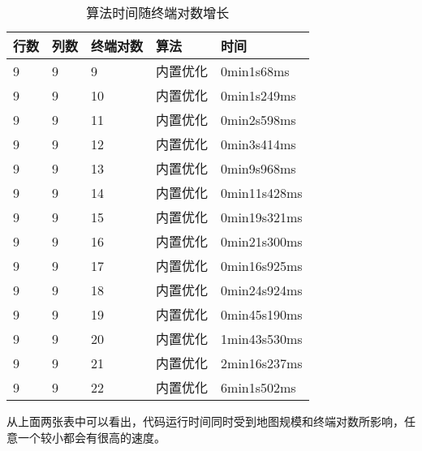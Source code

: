 \documentclass[a4paper, 11pt]{article}
\begin{document}
\begin{table}[!htp]
	\centering
	\begin{tabular}{@{}lllll@{}}
		\toprule
		行数 & 列数 & 终端对数 & 算法 & 时间 \\ \midrule
		9 & 9 & 9 & 内置优化 & 0min1s68ms \\
		9 & 9 & 10 & 内置优化 & 0min1s249ms \\
		9 & 9 & 11 & 内置优化 & 0min2s598ms \\
		9 & 9 & 12 & 内置优化 & 0min3s414ms \\
		9 & 9 & 13 & 内置优化 & 0min9s968ms \\
		9 & 9 & 14 & 内置优化 & 0min11s428ms \\
		9 & 9 & 15 & 内置优化 & 0min19s321ms \\
		9 & 9 & 16 & 内置优化 & 0min21s300ms \\
		9 & 9 & 17 & 内置优化 & 0min16s925ms \\
		9 & 9 & 18 & 内置优化 & 0min24s924ms \\
		9 & 9 & 19 & 内置优化 & 0min45s190ms \\
		9 & 9 & 20 & 内置优化 & 1min43s530ms \\
		9 & 9 & 21 & 内置优化 & 2min16s237ms \\
		9 & 9 & 22 & 内置优化 & 6min1s502ms \\
		\bottomrule
	\end{tabular}
	\caption{算法时间随终端对数增长}
	\label{my-label}
\end{table}

从上面两张表中可以看出，代码运行时间同时受到地图规模和终端对数所影响，任意一个较小都会有很高的速度。
\end{document}
